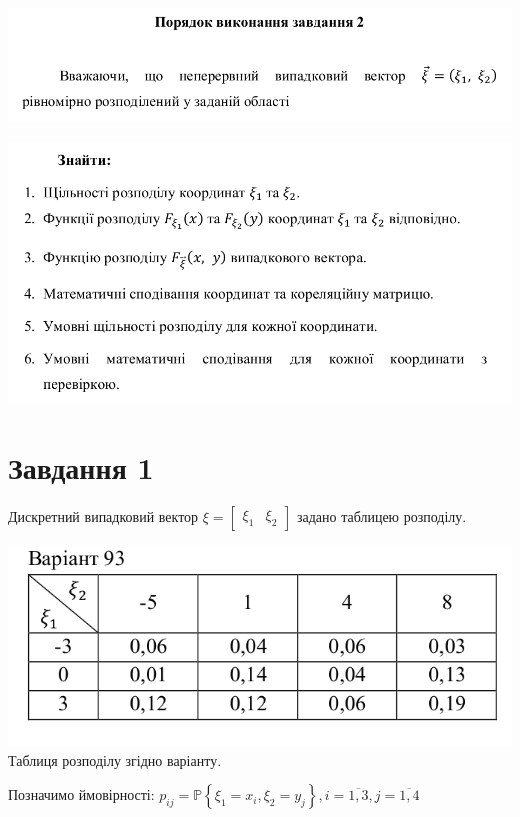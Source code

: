 \documentclass[14pt,a4paper]{scrartcl}
\theoremstyle{definition}
\theoremstyle{remark}
\theoremstyle{definition}
\theoremstyle{definition}
\begin{document}
\begin{center} \includegraphics[scale=0.5]{assets/2.png} \end{center}
\begin{center} \includegraphics[scale=0.5]{assets/3.png} \end{center}
\tableofcontents

\newpage

\section{Завдання 1}
Дискретний випадковий вектор $\xi = \begin{bmatrix}
 \xi_1 & \xi_2
\end{bmatrix}$ задано таблицею розподілу.

\begin{center}
 \includegraphics[scale=0.5]{assets/z193.png}\\
Таблиця розподілу згідно варіанту.
  \end{center}
Позначимо ймовірності: $ p_{ij} = \mathbb{P} \left\lbrace \xi_1 = x_i, \xi_2 = y_j \right\rbrace, i = \overline{1,3}, j = \overline{1,4}$
\end{document}
